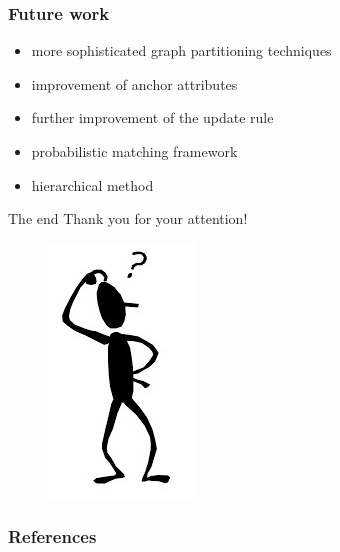 \documentclass[hyperref={pdfpagelabels=false}]{beamer}
\begin{document}
\begin{frame} %
\frametitle{Future work}
	\begin{itemize}
		\item more sophisticated graph partitioning techniques
		\item improvement of anchor attributes
		\item further improvement of the update rule
		\item probabilistic matching framework
		\item hierarchical method
	\end{itemize}
\end{frame}
\begin{frame}{The end}
\centering
\LARGE
\color{red}
Thank you for your attention!
\nocite{Cho_LearningG}
\end{frame}
\begin{frame}
\centering
\begin{figure}
	\includegraphics{who.png}
\end{figure}
\end{frame}
\begin{frame}[allowframebreaks]
	\frametitle{References}
	
	
\end{frame} 
\end{document}
